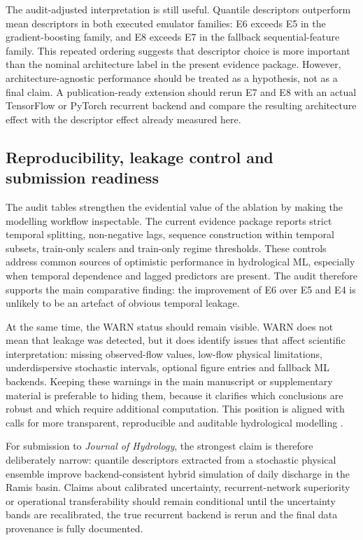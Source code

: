 \documentclass[a4paper,fleqn]{cas-sc}
\begin{document}
The audit-adjusted interpretation is still useful. Quantile descriptors
outperform mean descriptors in both executed emulator families: E6
exceeds E5 in the gradient-boosting family, and E8 exceeds E7 in the
fallback sequential-feature family. This repeated ordering suggests
that descriptor choice is more important than the nominal architecture
label in the present evidence package. However, architecture-agnostic
performance should be treated as a hypothesis, not as a final claim. A
publication-ready extension should rerun E7 and E8 with an actual
TensorFlow or PyTorch recurrent backend and compare the resulting
architecture effect with the descriptor effect already measured here.

\subsection{Reproducibility, leakage control and submission readiness}
\label{subsec:discussion-leakage}

The audit tables strengthen the evidential value of the ablation by
making the modelling workflow inspectable. The current evidence package
reports strict temporal splitting, non-negative lags, sequence
construction within temporal subsets, train-only scalers and train-only
regime thresholds. These controls address common sources of optimistic
performance in hydrological ML, especially when temporal dependence and
lagged predictors are present. The audit therefore supports the main
comparative finding: the improvement of E6 over E5 and E4 is unlikely
to be an artefact of obvious temporal leakage.

At the same time, the WARN status should remain visible. WARN does not
mean that leakage was detected, but it does identify issues that affect
scientific interpretation: missing observed-flow values, low-flow
physical limitations, underdispersive stochastic intervals, optional
figure entries and fallback ML backends. Keeping these warnings in the
main manuscript or supplementary material is preferable to hiding them,
because it clarifies which conclusions are robust and which require
additional computation. This position is aligned with calls for more
transparent, reproducible and auditable hydrological modelling
\citep{hall2021hydrologist,lees2021benchmarking,arsenault2022continuous}.

For submission to \emph{Journal of Hydrology}, the strongest claim is
therefore deliberately narrow: quantile descriptors extracted from a
stochastic physical ensemble improve backend-consistent hybrid
simulation of daily discharge in the Ramis basin. Claims about
calibrated uncertainty, recurrent-network superiority or operational
transferability should remain conditional until the uncertainty bands
are recalibrated, the true recurrent backend is rerun and the final data
provenance is fully documented.
\end{document}

